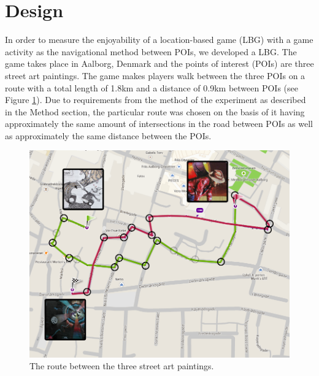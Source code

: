 \section{Design}
In order to measure the enjoyability of a location-based game (LBG) with a game activity as the navigational method between POIs, we developed a LBG. The game takes place in Aalborg, Denmark and the points of interest (POIs) are three street art paintings\cite{streetart}. The game makes players walk between the three POIs on a route with a total length of 1.8km and a distance of 0.9km between POIs (see Figure \ref{FinalRoute}). Due to requirements from the method of the experiment as described in the Method section, the particular route was chosen on the basis of it having approximately the same amount of intersections in the road between POIs as well as approximately the same distance between the POIs.

\begin{figure}[hbtp]
\centering
\includegraphics[scale=0.2]{Pics/FinalRoute.png}
\caption{The route between the three street art paintings.}
\label{FinalRoute}
\end{figure}

